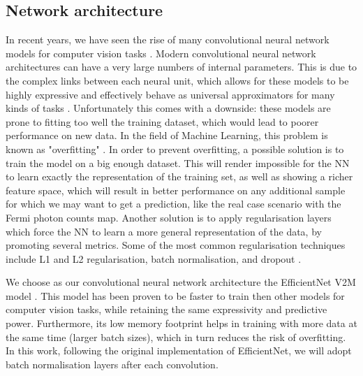 \documentclass[a4paper,11pt]{article}
\begin{document}
\subsection{Network architecture}
In recent years, we have seen the rise of many convolutional neural network models for computer vision tasks \cite{CNNreview1,CNNreview2,CNNreview3}.
Modern convolutional neural network architectures can have a very large numbers of internal parameters. This is due to the complex links between each neural unit, which allows for these models to be highly expressive and effectively behave as universal approximators for many kinds of tasks \cite{HORNIK1989359}. Unfortunately this comes with a downside: these models are prone to fitting too well the training dataset, which would lead to poorer performance on new data. In the field of Machine Learning, this problem is known as "overfitting" \cite{overfitting}. In order to prevent overfitting, 
a possible solution is to train the model on a big enough dataset.
This will render impossible for the NN to learn exactly the representation of the training set, as well as showing a richer feature space, which will result in better performance on any additional sample for which we may want to get a prediction, like the real case scenario with the Fermi photon counts map. Another solution is to apply regularisation layers which force the NN to learn a more general representation of the data, by promoting several metrics. Some of the most common regularisation techniques include L1 and L2 regularisation, batch normalisation, and dropout \cite{dropout,batchnorm,regularisation1,regularisation2}.

We choose as our convolutional neural network architecture the EfficientNet V2M model \cite{efficient-net-v2}. This model has been proven to be faster to train then other models for computer vision tasks, while retaining the same expressivity and predictive power. 
Furthermore, its low memory footprint helps in training with more data at the same time (larger batch sizes), which in turn reduces the risk of overfitting.
In this work, following the original implementation of EfficientNet, we will adopt batch normalisation layers after each convolution.
\end{document}
